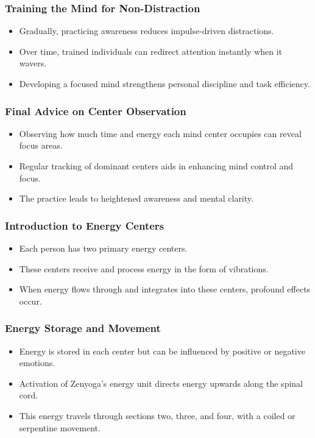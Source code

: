 \begin{frame}[fragile]\frametitle{Training the Mind for Non-Distraction}
    \begin{itemize}
        \item Gradually, practicing awareness reduces impulse-driven distractions.
        \item Over time, trained individuals can redirect attention instantly when it wavers.
        \item Developing a focused mind strengthens personal discipline and task efficiency.
    \end{itemize}
\end{frame}

\begin{frame}[fragile]\frametitle{Final Advice on Center Observation}
    \begin{itemize}
        \item Observing how much time and energy each mind center occupies can reveal focus areas.
        \item Regular tracking of dominant centers aids in enhancing mind control and focus.
        \item The practice leads to heightened awareness and mental clarity.
    \end{itemize}
\end{frame}


\begin{frame}[fragile]\frametitle{Introduction to Energy Centers}
    \begin{itemize}
        \item Each person has two primary energy centers.
        \item These centers receive and process energy in the form of vibrations.
        \item When energy flows through and integrates into these centers, profound effects occur.
    \end{itemize}
\end{frame}

\begin{frame}[fragile]\frametitle{Energy Storage and Movement}
    \begin{itemize}
        \item Energy is stored in each center but can be influenced by positive or negative emotions.
        \item Activation of Zenyoga’s energy unit directs energy upwards along the spinal cord.
        \item This energy travels through sections two, three, and four, with a coiled or serpentine movement.
    \end{itemize}
\end{frame}

